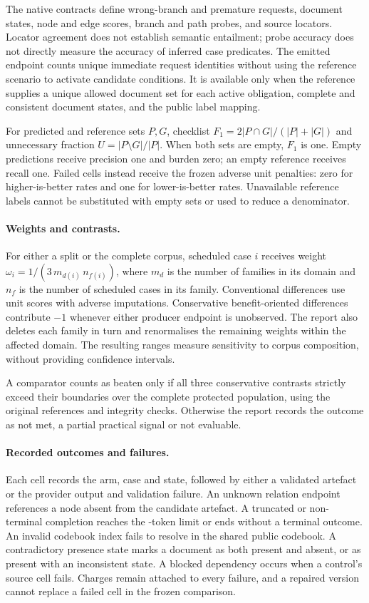 The native contracts define wrong-branch and premature requests, document
states, node and edge scores, branch and path probes, and source locators.
Locator agreement does not establish semantic entailment; probe accuracy
does not directly measure the accuracy of inferred case predicates.
The emitted endpoint counts unique immediate request identities without
using the reference scenario to activate candidate conditions. It is
available only when the reference supplies a unique allowed document set
for each active obligation, complete and consistent document states, and
the public label mapping.

For predicted and reference sets $P,G$, checklist
$F_1=2|P\cap G|/(|P|+|G|)$ and unnecessary fraction
$U=|P\setminus G|/|P|$. When both sets are empty, $F_1$ is one. Empty
predictions receive precision one and burden zero; an empty reference
receives recall one. Failed cells instead receive the frozen adverse unit
penalties: zero for higher-is-better rates and one for lower-is-better
rates. Unavailable reference labels cannot be substituted with empty sets
or used to reduce a denominator.

\paragraph{Weights and contrasts.}
For either a split or the complete corpus, scheduled case $i$ receives
weight $\omega_i=1/(3\,m_{d(i)}\,n_{f(i)})$, where $m_d$ is the number of
families in its domain and $n_f$ is the number of scheduled cases in its
family. Conventional differences use unit scores with adverse imputations.
Conservative benefit-oriented differences contribute $-1$ whenever either
producer endpoint is unobserved. The report also deletes each family in
turn and renormalises the remaining weights within the affected domain.
The resulting ranges measure sensitivity to corpus composition, without
providing confidence intervals.

A comparator counts as beaten only if all three conservative contrasts
strictly exceed their boundaries over the complete protected population,
using the original references and integrity checks. Otherwise the report
records the outcome as not met, a partial practical signal or not evaluable.

\paragraph{Recorded outcomes and failures.}
Each cell records the arm, case and state, followed by either a validated
artefact or the provider output and validation failure. An unknown relation
endpoint references a node absent from the candidate artefact. A truncated
or non-terminal completion reaches the \nbTokens-token limit or ends
without a terminal outcome. An invalid codebook index fails to resolve in
the shared public codebook. A contradictory presence state marks a document
as both present and absent, or as present with an inconsistent state. A
blocked dependency occurs when a control's \casepath source cell fails.
Charges remain attached to every failure, and a repaired version cannot
replace a failed cell in the frozen comparison.

